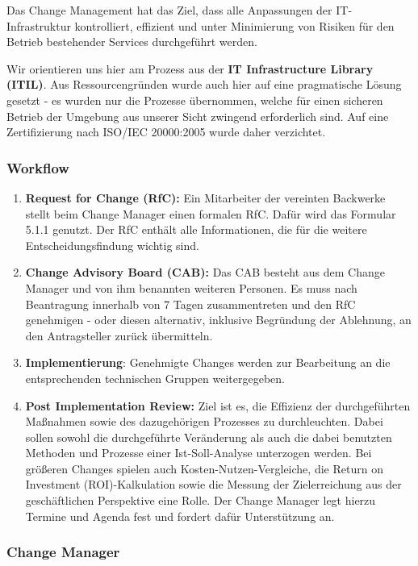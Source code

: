 \documentclass[]{article}
\begin{document}
Das Change Management hat das Ziel, dass alle Anpassungen der
IT-Infrastruktur kontrolliert, effizient und unter Minimierung von
Risiken für den Betrieb bestehender Services durchgeführt werden.

Wir orientieren uns hier am Prozess aus der \textbf{IT Infrastructure
Library (ITIL)}. Aus Ressourcengründen wurde auch hier auf eine
pragmatische Lösung gesetzt - es wurden nur die Prozesse übernommen,
welche für einen sicheren Betrieb der Umgebung aus unserer Sicht
zwingend erforderlich sind. Auf eine Zertifizierung nach ISO/IEC
20000:2005 wurde daher verzichtet.

\subsubsection{Workflow}\label{workflow}

\begin{enumerate}
\def\labelenumi{\arabic{enumi}.}
\item
  \textbf{Request for Change (RfC):} Ein Mitarbeiter der vereinten
  Backwerke stellt beim Change Manager einen formalen RfC. Dafür wird
  das Formular 5.1.1 genutzt. Der RfC enthält alle Informationen, die
  für die weitere Entscheidungsfindung wichtig sind.
\item
  \textbf{Change Advisory Board (CAB):} Das CAB besteht aus dem Change
  Manager und von ihm benannten weiteren Personen. Es muss nach
  Beantragung innerhalb von 7 Tagen zusammentreten und den RfC
  genehmigen - oder diesen alternativ, inklusive Begründung der Ablehnung, an
  den Antragsteller zurück übermitteln.
\item
  \textbf{Implementierung}: Genehmigte Changes werden zur Bearbeitung an
  die entsprechenden technischen Gruppen weitergegeben.
\item
  \textbf{Post Implementation Review:} Ziel ist es, die Effizienz der
  durchgeführten Maßnahmen sowie des dazugehörigen Prozesses zu
  durchleuchten. Dabei sollen sowohl die durchgeführte Veränderung als
  auch die dabei benutzten Methoden und Prozesse einer Ist-Soll-Analyse
  unterzogen werden. Bei größeren Changes spielen auch
  Kosten-Nutzen-Vergleiche, die Return on Investment (ROI)-Kalkulation
  sowie die Messung der Zielerreichung aus der geschäftlichen
  Perspektive eine Rolle. Der Change Manager legt hierzu Termine und
  Agenda fest und fordert dafür Unterstützung an.
\end{enumerate}

\subsubsection{Change Manager}\label{change-manager}
\end{document}

